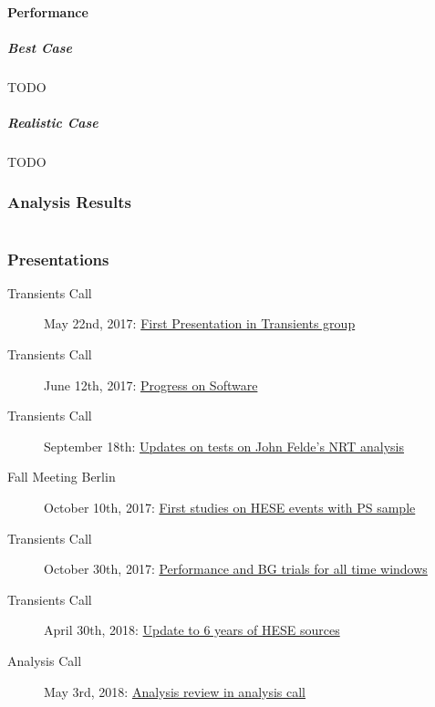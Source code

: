 \subsection{Performance}
\subsubsection{Best Case}
TODO
\subsubsection{Realistic Case}
TODO


\section{Analysis Results}



\appendix
\part*{\appendixname}
\section{Presentations}
\begin{description}
  \item[Transients Call] May 22nd, 2017: \href{https://drive.google.com/file/d/0B_Gkg-MCR-1za1RMbjlzTFE0YVU/view}{First Presentation in Transients group}
  \item[Transients Call] June 12th, 2017: \href{https://drive.google.com/file/d/0B_Gkg-MCR-1zTFI3Umg3XzZrSE0/view}{Progress on Software}
  \item[Transients Call] September 18th: \href{https://drive.google.com/file/d/0B_Gkg-MCR-1zR28tTmhBT3VYTGs/view}{Updates on tests on John Felde's NRT analysis}
  \item[Fall Meeting Berlin] October 10th, 2017: \href{https://events.icecube.wisc.edu/getFile.py/access?contribId=37&sessionId=32&resId=0&materialId=slides&confId=90}{First studies on HESE events with PS sample}
  \item[Transients Call] October 30th, 2017: \href{https://drive.google.com/file/d/0B_Gkg-MCR-1zOFdkajczT3JWNUU/view}{Performance and BG trials for all time windows}
  \item[Transients Call] April 30th, 2018: \href{https://drive.google.com/file/d/12vOMOpt1nMrmnBdM_4wV5sMdg0FUJLqF/view}{Update to 6 years of HESE sources}
  \item[Analysis Call] May 3rd, 2018: \href{https://drive.google.com/file/d/199a-w_JzH4m6RdVKmOb57rWMw4-HDSJj/view}{Analysis review in analysis call}
\end{description}

